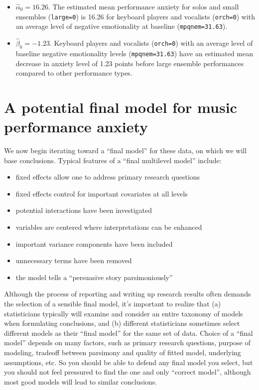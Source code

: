\documentclass[
]{krantz}
\providecommand{\tightlist}{%
  \setlength{\itemsep}{0pt}\setlength{\parskip}{0pt}}
\begin{document}
\begin{itemize}
\tightlist
\item
  \(\hat{\alpha}_{0} = 16.26\). The estimated mean performance anxiety for solos and small ensembles (\texttt{large=0}) is 16.26 for keyboard players and vocalists (\texttt{orch=0}) with an average level of negative emotionality at baseline (\texttt{mpqnem=31.63}).
\item
  \(\hat{\beta}_{0} = -1.23\). Keyboard players and vocalists (\texttt{orch=0}) with an average level of baseline negative emotionality levels (\texttt{mpqnem=31.63}) have an estimated mean decrease in anxiety level of 1.23 points before large ensemble performances compared to other performance types.
\end{itemize}

\hypertarget{modelf}{%
\section{A potential final model for music performance anxiety}\label{modelf}}

We now begin iterating toward a ``final model'' for these data, on which we will base conclusions. Typical features of a ``final multilevel model''  include:

\begin{itemize}
\tightlist
\item
  fixed effects allow one to address primary research questions
\item
  fixed effects control for important covariates at all levels
\item
  potential interactions have been investigated
\item
  variables are centered where interpretations can be enhanced
\item
  important variance components have been included
\item
  unnecessary terms have been removed
\item
  the model tells a ``persuasive story parsimoniously''
\end{itemize}

Although the process of reporting and writing up research results often demands the selection of a sensible final model, it's important to realize that (a) statisticians typically will examine and consider an entire taxonomy of models when formulating conclusions, and (b) different statisticians sometimes select different models as their ``final model'' for the same set of data. Choice of a ``final model'' depends on many factors, such as primary research questions, purpose of modeling, tradeoff between parsimony and quality of fitted model, underlying assumptions, etc. So you should be able to defend any final model you select, but you should not feel pressured to find the one and only ``correct model'', although most good models will lead to similar conclusions.
\end{document}
